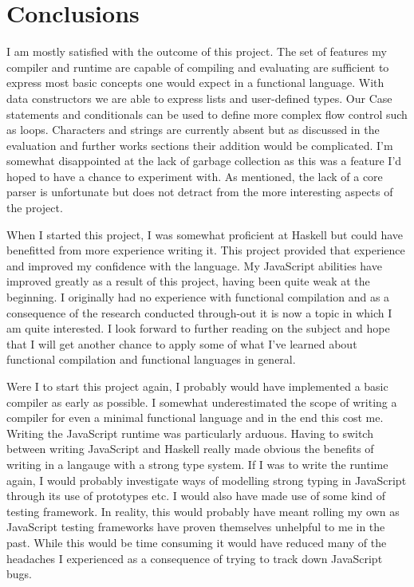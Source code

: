 \section{Conclusions}
I am mostly satisfied with the outcome of this project. The
set of features my compiler and runtime are capable of compiling
and evaluating are sufficient to express most basic concepts
one would expect in a functional language. With data constructors
we are able to express lists and user-defined types. Our Case 
statements and conditionals can be used to define more complex
flow control such as loops. Characters and strings are currently
absent but as discussed in the evaluation and further works sections
their addition would be complicated. I'm somewhat disappointed at
the lack of garbage collection as this was a feature I'd hoped to
have a chance to experiment with. As mentioned, the lack of a core
parser is unfortunate but does not detract from the more interesting
aspects of the project. 

When I started this project, I was somewhat proficient at Haskell
but could have benefitted from more experience writing
it. This project provided that experience and improved my
confidence with the language. My JavaScript abilities have
improved greatly as a result of this project, having been quite
weak at the beginning. I originally had no experience with functional
compilation and as a consequence of the research conducted through-out
it is now a topic in which I am quite interested. I look forward
to further reading on the subject and hope that I will get another
chance to apply some of what I've learned about functional compilation
and functional languages in general. 

Were I to start this project again, I probably would have implemented
a basic compiler as early as possible. I somewhat underestimated the
scope of writing a compiler for even a minimal functional language
and in the end this cost me. Writing the JavaScript runtime was 
particularly arduous. Having to switch between writing JavaScript
and Haskell really made obvious the benefits of writing in a 
langauge with a strong type system. If I was to write the runtime
again, I would probably investigate ways of modelling strong
typing in JavaScript through its use of prototypes etc. I would
also have made use of some kind of testing framework. In reality,
this would probably have meant rolling my own as JavaScript testing
frameworks have proven themselves unhelpful to me in the past. While
this would be time consuming it would have reduced many of the
headaches I experienced as a consequence of trying to track down
JavaScript bugs. 